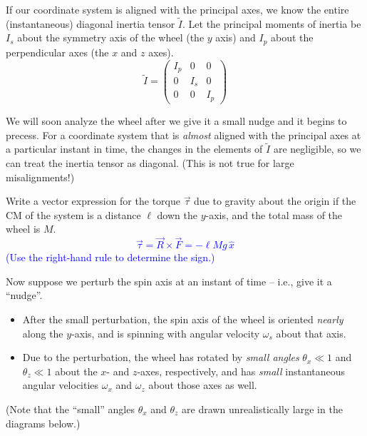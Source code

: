 \documentclass[11pt, letterpaper, openany]{book}
\newenvironment{exercise}[1][Exercise]{%
  \tcolorbox[blanker, breakable, left=1em,
    before skip=1em, after skip=1em,
    borderline west={3pt}{0pt}{PhysNavy},
    colback=PhysCream,
    before upper={\textcolor{PhysNavy}{\sffamily\bfseries #1:}\space}
  ]%
}{%
  \endtcolorbox%
}
\begin{document}
If our coordinate system is aligned with the principal axes, we know the entire (instantaneous) diagonal inertia tensor $\tilde{I}$. Let the principal moments of inertia be $I_s$ about the symmetry axis of the wheel (the $y$ axis) and $I_p$ about the perpendicular axes (the $x$ and $z$ axes).
\[ \tilde{I} = \begin{pmatrix} I_p & 0 & 0 \\ 0 & I_s & 0 \\ 0 & 0 & I_p \end{pmatrix} \]

We will soon analyze the wheel after we give it a small nudge and it begins to precess. For a coordinate system that is \textit{almost} aligned with the principal axes at a particular instant in time, the changes in the elements of $\tilde{I}$ are negligible, so we can treat the inertia tensor as diagonal. (This is not true for large misalignments!)

\begin{exercise}[Exercise 2]
Write a vector expression for the torque $\vec{\tau}$ due to gravity about the origin if the CM of the system is a distance $\ell$ down the $y$-axis, and the total mass of the wheel is $M$. \\
\textcolor{blue}{
\[ \vec{\tau} = \vec{R} \times \vec{F} = -\ell Mg\,\hat{x} \]
(Use the right-hand rule to determine the sign.)
}
\end{exercise}

Now suppose we perturb the spin axis at an instant of time -- i.e., give it a ``nudge''.
\begin{itemize}
    \item After the small perturbation, the spin axis of the wheel is oriented \textit{nearly} along the $y$-axis, and is spinning with angular velocity $\omega_s$ about that axis.
    \item Due to the perturbation, the wheel has rotated by \textit{small angles} $\theta_x \ll 1$ and $\theta_z \ll 1$ about the $x$- and $z$-axes, respectively, and has \textit{small} instantaneous angular velocities $\omega_x$ and $\omega_z$ about those axes as well.
\end{itemize}

(Note that the ``small'' angles $\theta_x$ and $\theta_z$ are drawn unrealistically large in the diagrams below.)
\end{document}
